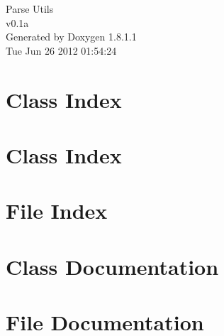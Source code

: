\documentclass{book}
\begin{document}
\hypersetup{pageanchor=false,citecolor=blue}
\begin{titlepage}
\vspace*{7cm}
\begin{center}
{\Large Parse Utils \\[1ex]\large v0.\-1a }\\
\vspace*{1cm}
{\large Generated by Doxygen 1.8.1.1}\\
\vspace*{0.5cm}
{\small Tue Jun 26 2012 01:54:24}\\
\end{center}
\end{titlepage}
\clearemptydoublepage
{}
\tableofcontents
\clearemptydoublepage
{}
\hypersetup{pageanchor=true,citecolor=blue}
\chapter{Class Index}

\chapter{Class Index}

\chapter{File Index}

\chapter{Class Documentation}













\chapter{File Documentation}







































\printindex
\end{document}
